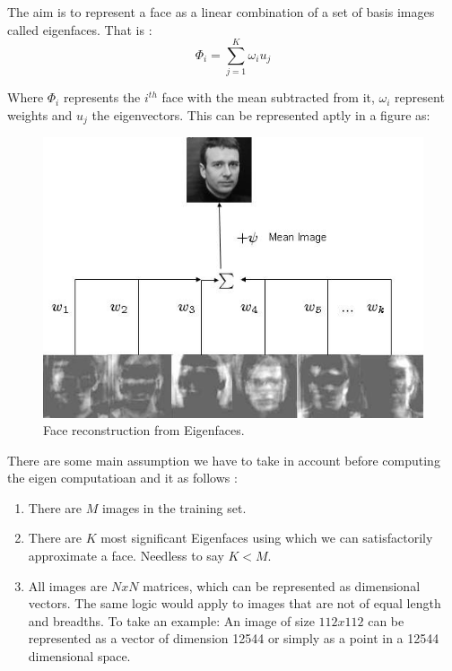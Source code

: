 \documentclass[a4paper,twoside]{article}
\begin{document}
 The aim is to represent a face as a linear combination of a set of basis images called eigenfaces. That is :
\begin{equation}

\Phi _i  = \sum\limits_{j = 1}^K {\omega _i u_j }
\end{equation}

Where $\Phi_i$ represents the $i^{th}$ face with the mean subtracted from it, $\omega _i$ represent weights and  $u_j$ the eigenvectors.
This can be represented aptly in a figure as:

\begin{figure}[h]
 \begin{center}
 \centering
\includegraphics[scale=0.3]{eigenfacesrec.jpg} \caption{Face reconstruction from Eigenfaces. }
 \end{center}\end{figure}

There are some main assumption we have to take in account before computing the eigen computatioan and it as follows :%
\begin{enumerate}

\item There are $M$ images in the training set.

\item There are $K$ most significant Eigenfaces using which we can satisfactorily approximate a face. Needless to say $K <M$.

\item All images are $NxN$ matrices, which can be represented as dimensional vectors. The same logic would apply to images that are not of equal length and breadths. To take an example: An image of size $112 x 112$ can be represented as a vector of dimension 12544 or simply as a point in a 12544 dimensional space.
\end{enumerate}
\end{document}
